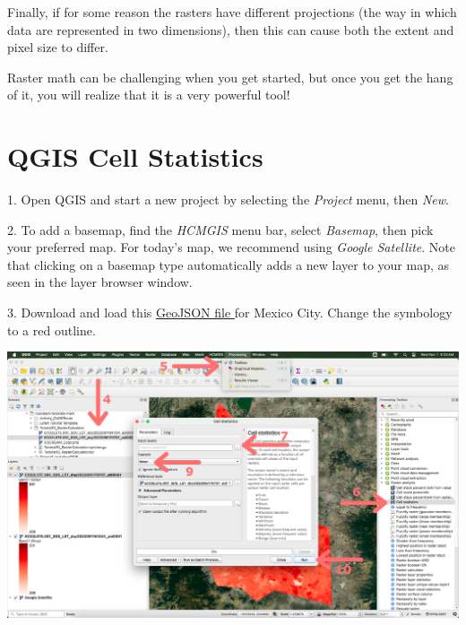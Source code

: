 \documentclass[oneside,a4paper,11pt,explicit]{book}
\begin{document}
\begin{tcolorbox}[enhanced jigsaw,breakable,pad at break*=1mm,
  colback=yellow!5!white,colframe=IceCreamLeaf,title=An Introduction to Raster Math]
    Finally, if for some reason the rasters have different projections (the way in which data are represented in two dimensions), then this can cause both the extent and pixel size to differ. 

     \vspace{.5em}
 
    Raster math can be challenging when you get started, but once you get the hang of it, you will realize that it is a very powerful tool! 

\end{tcolorbox}

\clearpage

\section{QGIS Cell Statistics}

1. Open QGIS and start a new project by selecting the \textit{Project} menu, then \textit{New}.

2. To add a basemap, find the \textit{HCMGIS} menu bar, select \textit{Basemap}, then pick your preferred map. For today's map, we recommend using \textit{Google Satellite}. Note that clicking on a basemap type automatically adds a new layer to your map, as seen in the layer browser window.

3. Download and load this \href{https://jeremydforsythe.github.io/icecream-tutorials/Tutorial10_ESI/MexicoCityPolygon/MexicoCity.geojson}{GeoJSON file }for Mexico City. Change the symbology to a red outline.

\vspace{.5em}

\centerline{\includegraphics[width=\textwidth]{CellStatistics.png}}

\vspace{.5em}
\end{document}
